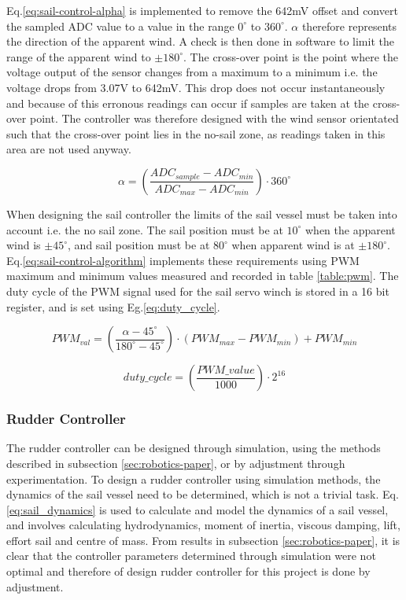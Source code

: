 Eq.\ref{eq:sail-control-alpha} is implemented to remove the 642mV offset and convert the sampled ADC value to a value in the range $0^{\circ}$ to $360^{\circ}$. $\alpha$ therefore represents the
direction of the apparent wind. A check is then done in software to limit the range of the apparent wind to $\pm180^{\circ}$. The cross-over point is the point where the voltage output of the sensor 
changes from a maximum to a minimum i.e. the voltage drops from 3.07V to 642mV. This drop does 
not occur instantaneously and because of this erronous readings can occur if samples are taken at the cross-over point. The controller was therefore designed with the wind sensor orientated such that 
the cross-over point lies in the no-sail zone, as readings taken in this area are not used anyway.


\begin{equation}
    \label{eq:sail-control-alpha}
    \alpha = \left( \frac{ADC_{sample} - ADC_{min}}{ADC_{max} - ADC_{min}} \right) \cdot 360^{\circ}
\end{equation}


When designing the sail controller the limits of the sail vessel must be taken into account i.e. the no sail zone. The sail position must be at $10^{\circ}$ when the apparent wind is $\pm 45^{\circ}$,
and sail position must be at $80^{\circ}$ when apparent wind is at $\pm 180^{\circ}$. Eq.\ref{eq:sail-control-algorithm} implements these requirements using PWM maximum and minimum values measured and recorded in table
\ref{table:pwm}. The duty cycle of the PWM signal used for the sail servo winch is stored in a 16 bit register, and is set using Eg.\ref{eq:duty_cycle}.

\begin{equation}
    \label{eq:sail-control-algorithm}
    PWM_{val} = \left( \frac{\alpha - 45^{\circ}}{180^{\circ} - 45^{\circ}} \right) \cdot \left( PWM_{max} - PWM_{min}\right) + PWM_{min}
\end{equation}

\begin{equation}
    \label{eq:duty_cycle}
    duty\_cycle = \left(\frac{PWM\_value}{1000}\right) \cdot 2^{16}
\end{equation}


\subsubsection{Rudder Controller}
The rudder controller can be designed through simulation, using the methods described in subsection \ref{sec:robotics-paper}, or by adjustment through experimentation. To design a rudder 
controller using simulation methods, the dynamics of the sail vessel need to be determined, which is not a trivial task. Eq.\ref{eq:sail_dynamics} is used to calculate and model the dynamics 
of a sail vessel, and involves calculating hydrodynamics, moment of inertia, viscous damping, lift, effort sail and centre of mass. From results in subsection \ref{sec:robotics-paper}, 
it is clear that the controller parameters determined through simulation were not optimal and therefore of design rudder controller for this project is done by adjustment.

